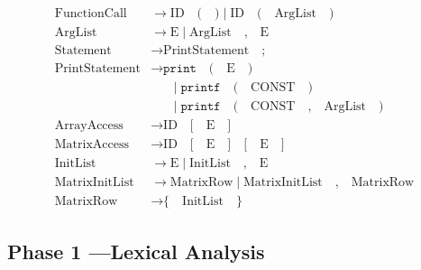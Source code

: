 \documentclass[letterpaper,12pt,oneside]{article}
\begin{document}
\begin{align*}
\text{FunctionCall} &\rightarrow \text{ID} \quad \texttt{(} \quad \texttt{)} \mid \text{ID} \quad \texttt{(} \quad \text{ArgList} \quad \texttt{)} \\
\text{ArgList} &\rightarrow \text{E} \mid \text{ArgList} \quad \texttt{,} \quad \text{E} \\
\text{Statement} &\rightarrow \text{PrintStatement} \quad \texttt{;} \\
\text{PrintStatement} &\rightarrow \texttt{print} \quad \texttt{(} \quad \text{E} \quad \texttt{)} \\
                     &\mathrel{\phantom{\rightarrow}} \mid \texttt{printf} \quad \texttt{(} \quad \text{CONST} \quad \texttt{)} \\
                     &\mathrel{\phantom{\rightarrow}} \mid \texttt{printf} \quad \texttt{(} \quad \text{CONST} \quad \texttt{,} \quad \text{ArgList} \quad \texttt{)} \\
\text{ArrayAccess} &\rightarrow \text{ID} \quad \texttt{[} \quad \text{E} \quad \texttt{]} \\
\text{MatrixAccess} &\rightarrow \text{ID} \quad \texttt{[} \quad \text{E} \quad \texttt{]} \quad \texttt{[} \quad \text{E} \quad \texttt{]} \\
\text{InitList} &\rightarrow \text{E} \mid \text{InitList} \quad \texttt{,} \quad \text{E} \\
\text{MatrixInitList} &\rightarrow \text{MatrixRow} \mid \text{MatrixInitList} \quad \texttt{,} \quad \text{MatrixRow} \\
\text{MatrixRow} &\rightarrow \texttt{\{} \quad \text{InitList} \quad \texttt{\}} 
\end{align*}

\subsection{Phase 1 ---Lexical Analysis}
\end{document}
